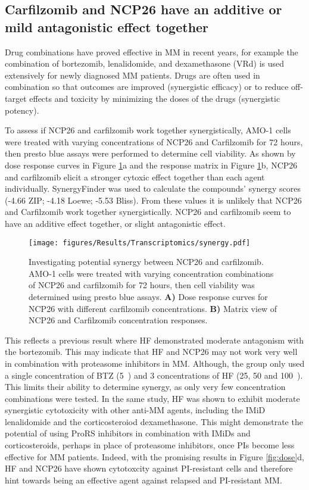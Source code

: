 \subsection{Carfilzomib and NCP26 have an additive or mild antagonistic effect together}\label{subsec:synergy}
Drug combinations have proved effective in MM in recent years, for example the combination of bortezomib, lenalidomide, and dexamethasone (VRd) is used extensively for newly diagnosed MM patients.
Drugs are often used in combination so that outcomes are improved (synergistic efficacy) or to reduce off-target effects and toxicity by minimizing the doses of the drugs (synergistic potency)\cite{meyer2019quantifying}.

To assess if NCP26 and carfilzomib work together synergistically, AMO-1 cells were treated with varying concentrations of NCP26 and Carfilzomib for 72 hours, then presto blue assays were performed to determine cell viability.
As shown by dose response curves in Figure \ref{fig:synergy}a and the response matrix in Figure \ref{fig:synergy}b, NCP26 and carfilzomib elicit a stronger cytoxic effect together than each agent individually.
SynergyFinder\cite{zheng2021synergyfinder} was used to calculate the compounds' synergy scores (-4.66 ZIP; -4.18 Loewe; -5.53 Bliss).
From these values it is unlikely that NCP26 and Carfilzomib work together synergistically.
NCP26 and carfilzomib seem to have an additive effect together, or slight antagonistic effect.
\begin{figure}[h]
\centering
\texttt{[image: figures/Results/Transcriptomics/synergy.pdf]}
\caption[NCP26 and carfilzomib synergism]{Investigating potential synergy between NCP26 and carfilzomib.
AMO-1 cells were treated with varying concentration combinations of NCP26 and carfilzomib for 72 hours, then cell viability was determined using presto blue assays.
\textbf{A)} Dose response curves for NCP26 with different carfilzomib concentrations.
\textbf{B)} Matrix view of NCP26 and Carfilzomib concentration responses.
}
\label{fig:synergy}
\end{figure}
This reflects a previous result where HF demonstrated moderate antagonism with the bortezomib\cite{leiba2012halofuginone}.
This may indicate that HF and NCP26 may not work very well in combination with proteasome inhibitors in MM.
Although, the group only used a single concentration of BTZ (5\si{\nano\Molar}) and 3 concentrations of HF (25, 50 and 100\si{\nano\Molar}).
This limits their ability to determine synergy, as only very few concentration combinations were tested.
In the same study, HF was shown to exhibit moderate synergistic cytotoxicity with other anti-MM agents, including the IMiD lenalidomide and the corticosteroiod dexamethasone.
This might demonstrate the potential of using ProRS inhibitors in combination with IMiDs and corticosteroids, perhaps in place of proteasome inhibitors, once PIs become less effective for MM patients.
Indeed, with the promising results in Figure \ref{fig:dose}d, HF and NCP26 have shown cytotoxcity against PI-resistant cells and therefore hint towards being an effective agent against relapsed and PI-resistant MM\@.

